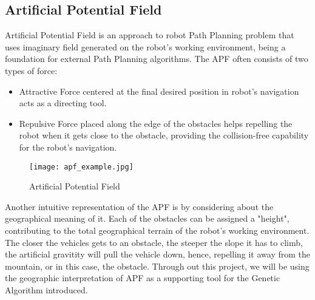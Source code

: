 \subsection{Artificial Potential Field}
Artificial Potential Field is an approach to robot Path Planning problem that uses imaginary field generated on the robot's working environment, being a foundation for external Path Planning algorithms. The APF often consists of two types of force:
\begin{itemize}
  \item Attractive Force centered at the final desired position in robot's navigation acts as a directing tool.
  \item Repulsive Force placed along the edge of the obstacles helps repelling the robot when it gets close to the obstacle, providing the collision-free capability for the robot's navigation.
\end{itemize}
\begin{wrapfigure}{r}{0.4\textwidth}
  \centering
  \addtolength{\belowcaptionskip}{-0.8ex}
  \texttt{[image: apf\_example.jpg]}
  \caption{Artificial Potential Field}
\end{wrapfigure}

Another intuitive representation of the APF is by considering about the geographical meaning of it. Each of the obstacles can be assigned a "height", contributing to the total geographical terrain of the robot's working environment. The closer the vehicles gets to an obstacle, the steeper the slope it has to climb, the artificial gravitity will pull the vehicle down, hence, repelling it away from the mountain, or in this case, the obstacle. Through out this project, we will be using the geographic interpretation of APF as a supporting tool for the Genetic Algorithm introduced.

